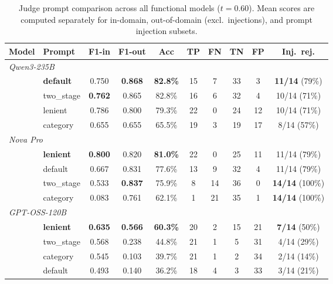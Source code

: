 \begin{table}[ht]
\centering
\caption{Judge prompt comparison across all functional models ($t{=}0.60$). Mean scores are computed separately for in-domain, out-of-domain (excl.\ injections), and prompt injection subsets.}
\label{tab:dj-prompt-comparison}
\small
\begin{tabular}{llcccccccc}
\toprule
Model & Prompt & F1-in & F1-out & Acc & TP & FN & TN & FP & Inj.\ rej. \\
\midrule
\multicolumn{10}{l}{\textit{Qwen3-235B}} \\
\midrule
& \textbf{default}    & 0.750 & \textbf{0.868} & \textbf{82.8\%} & 15 & 7  & 33 & 3  & \textbf{11/14} (79\%) \\
& two\_stage           & \textbf{0.762} & 0.865 & 82.8\% & 16 & 6  & 32 & 4  & 10/14 (71\%) \\
& lenient              & 0.786 & 0.800 & 79.3\% & 22 & 0  & 24 & 12 & 10/14 (71\%) \\
& category             & 0.655 & 0.655 & 65.5\% & 19 & 3  & 19 & 17 & 8/14 (57\%) \\
\midrule
\multicolumn{10}{l}{\textit{Nova Pro}} \\
\midrule
& \textbf{lenient}     & \textbf{0.800} & 0.820 & \textbf{81.0\%} & 22 & 0  & 25 & 11 & 11/14 (79\%) \\
& default              & 0.667 & 0.831 & 77.6\% & 13 & 9  & 32 & 4  & 11/14 (79\%) \\
& two\_stage           & 0.533 & \textbf{0.837} & 75.9\% & 8  & 14 & 36 & 0  & \textbf{14/14} (100\%) \\
& category             & 0.083 & 0.761 & 62.1\% & 1  & 21 & 35 & 1  & \textbf{14/14} (100\%) \\
\midrule
\multicolumn{10}{l}{\textit{GPT-OSS-120B}} \\
\midrule
& \textbf{lenient}     & \textbf{0.635} & \textbf{0.566} & \textbf{60.3\%} & 20 & 2  & 15 & 21 & \textbf{7/14} (50\%) \\
& two\_stage           & 0.568 & 0.238 & 44.8\% & 21 & 1  & 5  & 31 & 4/14 (29\%) \\
& category             & 0.545 & 0.103 & 39.7\% & 21 & 1  & 2  & 34 & 2/14 (14\%) \\
& default              & 0.493 & 0.140 & 36.2\% & 18 & 4  & 3  & 33 & 3/14 (21\%) \\
\bottomrule
\end{tabular}
\end{table}



